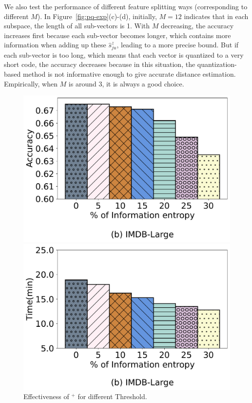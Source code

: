 We also test the performance of different feature splitting ways (corresponding to different $M$). In Figure~\ref{fig:pq-exp}(c)-(d), initially,  $M=12$ indicates that in each subspace, the length of all sub-vectors is 1. With $M$ decreasing, the accuracy increases first because each sub-vector becomes longer, which contains more information when adding up these $\hat{s}^z_{ju}$, leading to a more precise bound. But if each sub-vector is too long, which means that each vector is quantized to a very short code, the accuracy decreases because in this situation, the quantization-based method is not informative enough to give accurate  distance estimation. Empirically, when $M$ is around 3, it is always a good choice.

\begin{figure}[t]   
	\centering
	\begin{minipage}[t]{0.3\textwidth}
		\centering
		\includegraphics[width=\columnwidth]{figs/entropy_acc}
		\vspace{-1.5em}
		\caption{Effectiveness of \ours$^+$ for different Threshold.}
		\label{fig:entropy_acc}
	\end{minipage}
	\begin{minipage}[t]{0.3\textwidth}
		\centering
		\includegraphics[width=\columnwidth]{figs/entropy_time}

\end{minipage}
\end{figure}
